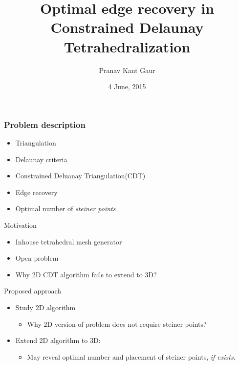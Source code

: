 \documentclass{beamer}
\title{Optimal edge recovery in Constrained Delaunay Tetrahedralization}
\author{Pranav Kant Gaur}
\institute{Computer graphics and Visualization section, \newline Computer Division}
\date{4 June, 2015}
\begin{document}
\begin{frame}
\titlepage
\end{frame}


\begin{frame}
\frametitle{Problem description}
\begin{itemize}
\item Triangulation
\item Delaunay criteria
\item Constrained Deluanay Triangulation(CDT)
\item Edge recovery
\item Optimal number of \textit{steiner points}
\end{itemize}
\end{frame}

\begin{frame}{Motivation}
\begin{itemize}
\item Inhouse tetrahedral mesh generator
\item Open problem 	
\item Why 2D CDT algorithm fails to extend to 3D? 
\end{itemize}		
\end{frame}

\begin{frame}{Proposed approach}
\begin{itemize}
\item Study 2D algorithm
	\begin{itemize}	
            \item Why 2D version of problem does not require steiner points?
	\end{itemize}
\item Extend 2D algorithm to 3D:
	\begin{itemize}
		\item May reveal optimal number and placement of steiner points, \textit{if exists}.
	\end{itemize}		
\end{itemize}
\end{frame}
\end{document}
